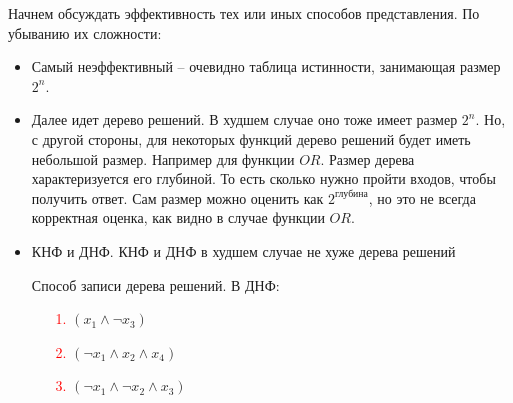 Начнем обсуждать эффективность тех или иных способов представления. По убыванию их сложности:
\begin{itemize}
  \item Самый неэффективный -- очевидно таблица истинности, занимающая размер $2^n$.
  \item Далее идет дерево решений. В худшем случае оно тоже имеет размер $2^n$. Но, с другой стороны, 
  для некоторых функций дерево решений будет иметь небольшой размер. Например для функции $OR$.
  Размер дерева характеризуется его глубиной. То есть сколько нужно пройти входов, чтобы получить ответ. Сам
  размер можно оценить как $2^{\text{глубина}}$, но это не всегда корректная оценка, как видно в случае функции $OR$.
  \item КНФ и ДНФ. КНФ и ДНФ в худшем случае не хуже дерева решений
  \begin{center}
  \end{center}
  Способ записи дерева решений. В ДНФ:
  \begin{enumerate}
    \item[\textcolor{red}{1.}] $(x_1 \land \lnot x_3)$
    \item[\textcolor{red}{2.}] $(\lnot x_1 \land x_2 \land x_4)$
    \item[\textcolor{red}{3.}] $(\lnot x_1 \land \lnot x_2 \land x_3)$
  \end{enumerate}

\end{itemize}
